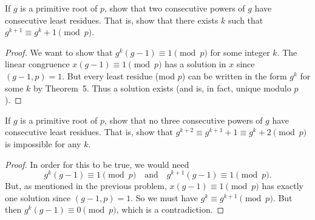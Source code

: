  If $g$ is a primitive root of $p$, show that two
consecutive powers of $g$ have consecutive least residues. That is,
show that there exists $k$ such that $g^{k+1}\equiv g^k+1\pmod{p}$.
\begin{proof}
  We want to show that $g^k(g - 1)\equiv1\pmod{p}$ for some integer
  $k$. The linear congruence $x(g - 1)\equiv1\pmod{p}$ has a solution
  in $x$ since $(g-1,p) = 1$. But every least residue (mod $p$) can be
  written in the form $g^k$ for some $k$ by Theorem~5. Thus a solution
  exists (and is, in fact, unique modulo $p$).
\end{proof}

 If $g$ is a primitive root of $p$, show that no three
consecutive powers of $g$ have consecutive least residues. That is,
show that $g^{k+2}\equiv g^{k+1}+1\equiv g^k+2\pmod{p}$ is impossible
for any $k$.
\begin{proof}
  In order for this to be true, we would need
  \begin{equation*}
    g^k(g - 1)\equiv1\pmod{p}
    \quad\text{and}\quad
    g^{k+1}(g - 1)\equiv1\pmod{p}.
  \end{equation*}
  But, as mentioned in the previous problem, $x(g - 1)\equiv1\pmod{p}$
  has exactly one solution since $(g - 1, p) = 1$. So we must have
  $g^k\equiv g^{k+1}\pmod{p}$. But then $g^k(g - 1)\equiv0\pmod{p}$,
  which is a contradiction.
\end{proof}
